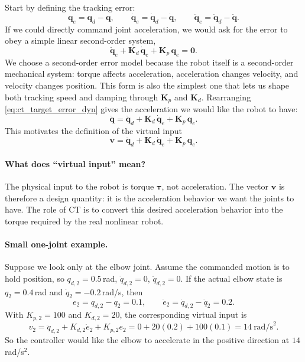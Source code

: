 \documentclass[11pt,a4paper]{article}
\newcommand{\vq}{\bm{q}}
\newcommand{\vqd}{\dot{\bm{q}}}
\newcommand{\vqdd}{\ddot{\bm{q}}}
\newcommand{\vtau}{\bm{\tau}}
\newcommand{\Kp}{\bm{K}_p}
\newcommand{\Kd}{\bm{K}_d}
\begin{document}
Start by defining the tracking error:
\begin{equation}
  \vq_e = \vq_d - \vq, \qquad
  \vqd_e = \vqd_d - \vqd, \qquad
  \vqdd_e = \vqdd_d - \vqdd.
\end{equation}
If we could directly command joint acceleration, we would ask for the error to
obey a simple linear second-order system,
\begin{equation}
  \vqdd_e + \Kd\,\vqd_e + \Kp\,\vq_e = \mathbf{0}.
  \label{eq:ct_target_error_dyn}
\end{equation}
We choose a second-order error model because the robot itself is a
second-order mechanical system: torque affects acceleration, acceleration
changes velocity, and velocity changes position.  This form is also the
simplest one that lets us shape both tracking speed and damping through
$\Kp$ and $\Kd$.
Rearranging \eqref{eq:ct_target_error_dyn} gives the acceleration we would like
the robot to have:
\begin{equation}
  \vqdd = \vqdd_d + \Kd\,\vqd_e + \Kp\,\vq_e.
\end{equation}
This motivates the definition of the virtual input
\begin{equation}
  \bm{v} = \vqdd_d + \Kd\,\vqd_e + \Kp\,\vq_e.
  \label{eq:ct_v_choice}
\end{equation}

\paragraph{What does ``virtual input'' mean?}
The physical input to the robot is torque $\vtau$, not acceleration.  The vector
$\bm{v}$ is therefore a design quantity: it is the acceleration behavior we want
the joints to have.  The role of CT is to convert this desired acceleration
behavior into the torque required by the real nonlinear robot.

\paragraph{Small one-joint example.}
Suppose we look only at the elbow joint.  Assume the commanded motion is to hold
position, so $q_{d,2}=0.5$\,rad, $\dot{q}_{d,2}=0$, $\ddot{q}_{d,2}=0$.  If the
actual elbow state is $q_2=0.4$\,rad and $\dot{q}_2=-0.2$\,rad/s, then
\begin{equation}
  e_2 = q_{d,2}-q_2 = 0.1, \qquad
  \dot{e}_2 = \dot{q}_{d,2}-\dot{q}_2 = 0.2.
\end{equation}
With $K_{p,2}=100$ and $K_{d,2}=20$, the corresponding virtual input is
\begin{equation}
  v_2 = \ddot{q}_{d,2} + K_{d,2}\dot{e}_2 + K_{p,2}e_2
      = 0 + 20(0.2) + 100(0.1) = 14\ \text{rad/s}^2.
\end{equation}
So the controller would like the elbow to accelerate in the positive direction
at $14$\,rad/s$^2$.
\end{document}

